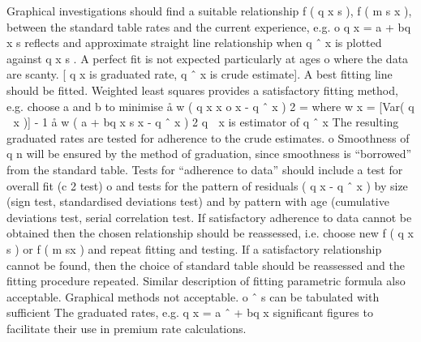 Graphical investigations should find a suitable relationship f ( q x s ), f ( m s x ),
between the standard table rates and the current experience, e.g.
o
q x = a + bq x s reflects and approximate straight line relationship when q ˆ x
is plotted against q x s . A perfect fit is not expected particularly at ages
o
where the data are scanty. [ q x is graduated rate, q ˆ x is crude estimate].
A best fitting line should be fitted. Weighted least squares provides a
satisfactory fitting method, e.g. choose a and b to minimise
å w ( q
x
x
o
x
- q ˆ x ) 2 =
where w x = [Var( q  x )] - 1
å w ( a + bq
x
s
x
- q ˆ x ) 2
q  x is estimator of q ˆ x
The resulting graduated rates are tested for adherence to the crude
estimates.
o
Smoothness of q n will be ensured by the method of graduation, since
smoothness is “borrowed” from the standard table.
Tests for “adherence to data” should include a test for overall fit (c 2 test)
o
and tests for the pattern of residuals ( q x - q ˆ x )
by size (sign test, standardised deviations test)
and by pattern with age (cumulative deviations test, serial correlation
test.
If satisfactory adherence to data cannot be obtained then the chosen
relationship should be reassessed, i.e. choose new f ( q x s ) or f ( m sx ) and
repeat fitting and testing.
If a satisfactory relationship cannot be found, then the choice of standard
table should be reassessed and the fitting procedure repeated.
Similar description of fitting parametric formula also acceptable.
Graphical methods not acceptable.
o
ˆ s can be tabulated with sufficient
The graduated rates, e.g. q x = a ˆ + bq
x
significant figures to facilitate their use in premium rate calculations.
